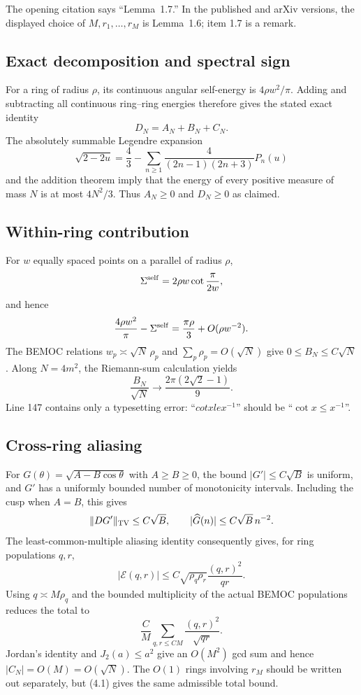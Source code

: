 \documentclass[11pt]{article}
\begin{document}
The opening citation says ``Lemma~1.7.''  In the published and arXiv versions,
the displayed choice of $M,r_1,\ldots,r_M$ is Lemma~1.6; item 1.7 is a remark.

\subsection{Exact decomposition and spectral sign}

For a ring of radius $\rho$, its continuous angular self-energy is
$4\rho w^2/\pi$.  Adding and subtracting all continuous ring--ring energies
therefore gives the stated exact identity
\[
 D_N=A_N+B_N+C_N.
\]
The absolutely summable Legendre expansion
\[
 \sqrt{2-2u}=\frac43-\sum_{n\ge1}
 \frac4{(2n-1)(2n+3)}P_n(u)
\]
and the addition theorem imply that the energy of every positive measure of
mass $N$ is at most $4N^2/3$.  Thus $A_N\ge0$ and $D_N\ge0$ as claimed.

\subsection{Within-ring contribution}

For $w$ equally spaced points on a parallel of radius $\rho$,
\[
 \Sigma^{\rm self}=2\rho w\cot\frac{\pi}{2w},
\]
and hence
\[
 \frac{4\rho w^2}{\pi}-\Sigma^{\rm self}
 =\frac{\pi\rho}{3}+O(\rho w^{-2}).
\]
The BEMOC relations $w_p\asymp\sqrt N\,\rho_p$ and
$\sum_p\rho_p=O(\sqrt N)$ give $0\le B_N\le C\sqrt N$.  Along $N=4m^2$,
the Riemann-sum calculation yields
\[
 \frac{B_N}{\sqrt N}\longrightarrow
 \frac{2\pi(2\sqrt2-1)}9.
\]
Line 147 contains only a typesetting error: ``$cot xle x^{-1}$'' should be
``$\cot x\le x^{-1}$''.

\subsection{Cross-ring aliasing}

For $G(\theta)=\sqrt{A-B\cos\theta}$ with $A\ge B\ge0$, the bound
$|G'|\le C\sqrt B$ is uniform, and $G'$ has a uniformly bounded number of
monotonicity intervals.  Including the cusp when $A=B$, this gives
\[
 \|DG'\|_{\rm TV}\le C\sqrt B,
 \qquad |\widehat G(n)|\le C\sqrt B\,n^{-2}.
\]
The least-common-multiple aliasing identity consequently gives, for ring
populations $q,r$,
\[
 |\mathcal E(q,r)|\le
 C\sqrt{\rho_q\rho_r}\frac{(q,r)^2}{qr}.
\]
Using $q\asymp M\rho_q$ and the bounded multiplicity of the actual BEMOC
populations reduces the total to
\[
 \frac CM\sum_{q,r\le CM}\frac{(q,r)^2}{\sqrt{qr}}.
\]
Jordan's identity and $J_2(a)\le a^2$ give an $O(M^2)$ gcd sum and hence
$|C_N|=O(M)=O(\sqrt N)$.  The $O(1)$ rings involving $r_M$ should be written
out separately, but (4.1) gives the same admissible total bound.
\end{document}
